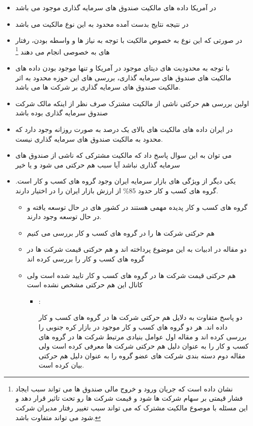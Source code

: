 \documentclass[12pt, a4paper]{article}
\begin{document}
\begin{itemize}
\item 
در آمریکا داده های مالکیت صندوق های سرمایه گذاری موجود می باشد
\item
در نتیجه نتایج بدست آمده محدود به این نوع مالکیت می باشد
\item
در صورتی که این نوع به خصوص مالکیت با توجه به نیاز ها و واسطه بودن، رفتار های به خصوصی انجام می دهند
\footnote{ 
	نشان داده است که جریان ورود و خروج مالی صندوق ها می تواند سبب ایجاد فشار قیمتی بر سهام شرکت ها شود و قیمت شرکت ها رو تحت تاثیر قرار دهد و این مسئله با موصوع مالکیت مشترک که می تواند سبب تغییر رفتار مدیران شرکت شود می تواند متفاوت باشد.}
\item
با توجه به محدودیت های دیتای موجود در آمریکا و  تنها موجود بودن داده های مالکیت های صندوق های سرمایه گذاری، بررسی های این حوزه محدود به اثر مالکیت صندوق های سرمایه گذاری بر شرکت ها می باشد.
\item
اولین بررسی هم حرکتی ناشی از مالکیت مشترک صرف نظر از اینکه مالک شرکت صندوق سرمایه گذاری بوده باشد

\item 
در ایران داده های مالکیت های بالای یک درصد به صورت روزانه وجود دارد که محدود به مالکیت صندوق های سرمایه گذاری نیست.
\item
می توان به این سوال پاسخ داد که مالکیت مشترکی که ناشی از صندوق های سرمایه گذاری نباشد آیا سبب هم حرکتی می شود و یا خیر
\item 
 یکی دیگر از ویژگی های بازار سرمایه ایران وجود گروه های کسب و کار است. گروه های کسب و کار حدود 85\% از ارزش بازار ایران را در اختیار دارند.
 \begin{itemize}
 \item
  گروه های کسب و کار پدیده مهمی هستند در کشور های در حال توسعه یافته و در حال توسعه وجود دارند.
  \item
  هم حرکتی شرکت ها را در گروه های کسب و کار بررسی می کنیم
  \item
  دو مقاله در ادبیات به این موضوع پرداخته اند و هم حرکتی قیمت شرکت ها در گروه های کسب و کار را بررسی کرده اند
  \item
  هم حرکتی قیمت شرکت ها در گروه های کسب و کار تایید شده است ولی کانال این هم حرکتی مشخص نشده است
  \begin{itemize}
  \item {}:
  \begin{itemize}
دو پاسخ متفاوت به دلایل هم حرکتی شرکت ها در گروه های کسب و کار داده اند. هر دو گروه های کسب و کار موجود در بازار کره جنوبی را بررسی کرده اند و مقاله اول عوامل بنیادی مرتبط شرکت ها در گروه های کسب و کار را به عنوان دلیل هم حرکتی شرکت ها معرفی کرده است ولی مقاله دوم دسته بندی شرکت های عضو گروه را به عنوان دلیل هم حرکتی بیان کرده است. 
  \end{itemize}
  
  \end{itemize}
 \end{itemize}
\end{itemize}
\end{document}

